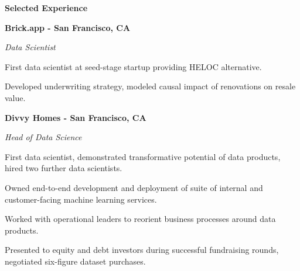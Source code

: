 \documentclass{res}
\begin{document}
{\begin{resume}
\begin{minipage}{7.6in}
\vspace{8mm}
\hrulefill\textbf{\hspace{2mm}Selected Experience\hspace{2mm}}\hrulefill
\vspace{2.5mm}




\textbf{Brick.app - San Francisco, CA}

\vspace{0.75mm}
{\it Data Scientist}  
\vspace{0.5mm}
\begin{list}{}{\leftmargin=1em}\itemsep-2pt
\item First data scientist at seed-stage startup providing HELOC alternative.
\item Developed underwriting strategy, modeled causal impact of renovations on resale value.
\end{list}

\vspace{3mm}
\textbf{Divvy Homes - San Francisco, CA}

\vspace{0.75mm}
{\it Head of Data Science}  
\vspace{0.5mm}
\begin{list}{}{\leftmargin=1em}\itemsep-2pt
\item First data scientist, demonstrated transformative potential of data products, hired two further data scientists.
\item Owned end-to-end development and deployment of suite of internal and customer-facing machine learning services.
\item Worked with operational leaders to reorient business processes around data products.
\item Presented to equity and debt investors during successful fundraising rounds, negotiated six-figure dataset purchases.
\end{list}


\end{minipage}
\end{resume}}
\end{document}
